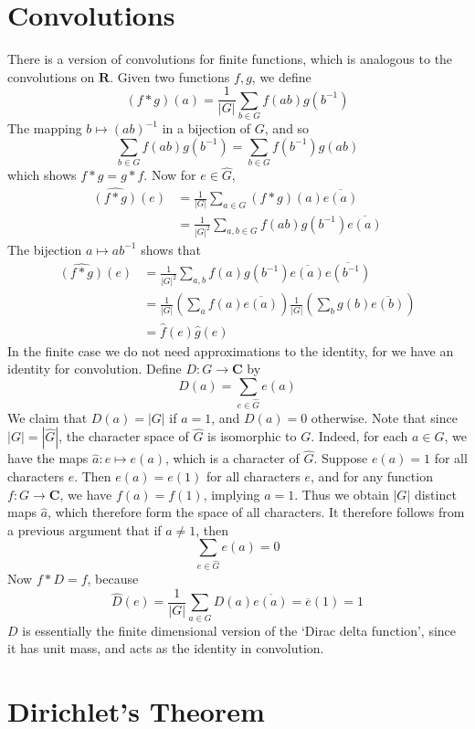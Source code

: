 \section{Convolutions}

There is a version of convolutions for finite functions, which is analogous to the convolutions on $\mathbf{R}$. Given two functions $f,g$, we define
%
\[ (f * g)(a) = \frac{1}{|G|} \sum_{b \in G} f(ab) g(b^{-1}) \]
%
The mapping $b \mapsto (ab)^{-1}$ in a bijection of $G$, and so
%
\[ \sum_{b \in G} f(ab) g(b^{-1}) = \sum_{b \in G} f(b^{-1}) g(ab) \]
%
which shows $f*g = g*f$. Now for $e \in \hat{G}$,
%
\begin{align*}
    \widehat{(f * g)}(e) &= \frac{1}{|G|} \sum_{a \in G} (f*g)(a) \overline{e(a)}\\
    &= \frac{1}{|G|^2} \sum_{a,b \in G} f(ab) g(b^{-1}) \overline{e(a)}
\end{align*}
%
The bijection $a \mapsto ab^{-1}$ shows that
%
\begin{align*}
    \widehat{(f*g)}(e) &= \frac{1}{|G|^2} \sum_{a,b} f(a) g(b^{-1}) \overline{e(a)} \overline{e(b^{-1})}\\
    &= \frac{1}{|G|} \left( \sum_a f(a) \overline{e(a)} \right) \frac{1}{|G|} \left( \sum_b g(b) \overline{e(b)} \right)\\
    &= \hat{f}(e) \hat{g}(e)
\end{align*}
%
In the finite case we do not need approximations to the identity, for we have an identity for convolution. Define $D: G \to \mathbf{C}$ by
%
\[ D(a) = \sum_{e \in \hat{G}} e(a) \]
%
We claim that $D(a) = |G|$ if $a = 1$, and $D(a) = 0$ otherwise. Note that since $|G| = |\hat{G}|$, the character space of $\hat{G}$ is isomorphic to $G$. Indeed, for each $a \in G$, we have the maps $\hat{a}: e \mapsto e(a)$, which is a character of $\hat{G}$. Suppose $e(a) = 1$ for all characters $e$. Then $e(a) = e(1)$ for all characters $e$, and for any function $f: G \to \mathbf{C}$, we have $f(a) = f(1)$, implying $a = 1$. Thus we obtain $|G|$ distinct maps $\hat{a}$, which therefore form the space of all characters. It therefore follows from a previous argument that if $a \neq 1$, then
%
\[ \sum_{e \in \hat{G}} e(a) = 0 \]
%
Now $f * D = f$, because
%
\[ \widehat{D}(e) = \frac{1}{|G|} \sum_{a \in G} D(a) \overline{e(a)} = \overline{e}(1) = 1 \]
%
$D$ is essentially the finite dimensional version of the `Dirac delta function', since it has unit mass, and acts as the identity in convolution.

\section{Dirichlet's Theorem}

